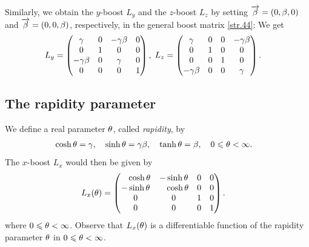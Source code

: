 \begin{small}
  
Similarly, we obtain the $y$-boost $L_y$ and the  
$z$-boost $L_z$ by setting  $\overrightarrow{{\beta}}=(0,{\beta},0)$  and 
$\overrightarrow{{\beta}}=(0,0,{\beta})$, respectively, in the general boost 
matrix \eqref{str.44}: We get
\begin{align}\label{str.49}
&L_y=\begin{pmatrix}
{\gamma} & 0 & - {\gamma}{\beta} & 0 \\
0& 1 & 0 & 0\\
-{\gamma} {\beta}&0& {\gamma} & 0 \\
0& 0 & 0 & 1 \end{pmatrix},\;
L_z=\begin{pmatrix}
{\gamma} & 0 & 0 &- {\gamma}{\beta} \\
0& 1 & 0 & 0 \\
0& 0 & 1 & 0 \\
-{\gamma} {\beta}& 0& 0 & {\gamma} \end{pmatrix} .
\end{align}

\subsection{The rapidity parameter}
We define a real parameter ${\theta}$, called 
\textsl{rapidity}, 
by
\begin{align}\label{str.50}
&\cosh{\theta}={\gamma},\quad
\sinh{\theta}={\gamma}{\beta},
\quad \tanh{\theta}={\beta},\quad 0\leqslant{\theta}<\infty.
\end{align}
The $x$-boost $L_x$ would then be given by 
\begin{align}\label{str.51}
L_x({\theta})&=\begin{pmatrix}
\phantom{-}\cosh{\theta} &-\sinh{\theta}&0&0\\
 -\sinh{\theta}& \phantom{-}\cosh{\theta} &0 &0\\
0&0&1 &0\\0&0&0 &1\\
\end{pmatrix} .
\end{align}
where $0\leqslant{\theta}<\infty$.
Observe that $L_x({\theta})$ is a differentiable function of 
the rapidity parameter ${\theta}$ in $0\leqslant{\theta}<\infty$.


\end{small}
